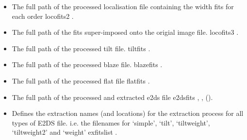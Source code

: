 \begin{itemize}
	\item {} 
	{The full path of the processed localisation file containing the width fits for each order}
	{locofits2}
	{\callocRAW}{\spirouConst.}{\callocRAW}
\end{itemize}

\begin{itemize}
	\item {} 
	{The full path of the fits super-imposed onto the origial image file.}
	{locofits3}
	{\callocRAW}{\spirouConst.}{\callocRAW}
\end{itemize}

\begin{itemize}
	\item {} 
	{The full path of the processed tilt file.}
	{tiltfits}
	{\calSLIT}{\spirouConst.}{\calSLIT}
\end{itemize}

\begin{itemize}
	\item {} 
	{The full path of the processed blaze file.}
	{blazefits}
	{\calFFraw}{\spirouConst.}{\calFFraw}
\end{itemize}


\begin{itemize}
	\item {} 
	{The full path of the processed flat file}
	{flatfits}
	{\calFFraw}{\spirouConst.}{\calFFraw}
\end{itemize}


\begin{itemize}
	\item {} 
	{The full path of the processed and extracted e2ds file}
	{e2dsfits}
	{\calextractRAW, \calextractRAWAB, \calextractRAWC()}{\spirouConst.}{\calextractRAW}
\end{itemize}


\begin{itemize}
	\item {} 
	{Defines the extraction names (and locations) for the extraction process for all types of E2DS file. i.e. the filenames for `simple', `tilt', `tiltweight', `tiltweight2' and `weight'}
	{exfitslist}
	{\calextractRAW}{\spirouConst.}{\calextractRAW}
\end{itemize}


